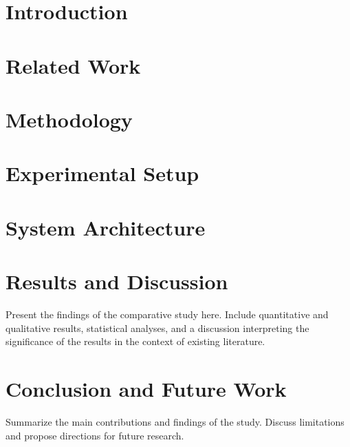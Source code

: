 \documentclass[11pt,twoside,openany]{book}
\begin{document}
\frontmatter
\thispagestyle{empty}



\renewcommand{\contentsname}{Contents}
{\let\oldchapter\chapter
\renewcommand{\chapter}[1]{}
\tableofcontents
\renewcommand{\chapter}{\oldchapter}}

\mainmatter

\chapter{Introduction}


\chapter{Related Work}


\chapter{Methodology}


\chapter{Experimental Setup}


\chapter{System Architecture}


\chapter{Results and Discussion}
Present the findings of the comparative study here. Include quantitative and qualitative results, statistical analyses, and a discussion interpreting the significance of the results in the context of existing literature.

\chapter{Conclusion and Future Work}
Summarize the main contributions and findings of the study. Discuss limitations and propose directions for future research.

\backmatter



\end{document}
